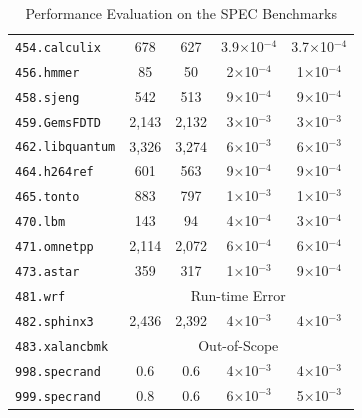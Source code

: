 \documentclass[letter]{ieice}
\begin{document}
\begin{table}[h]
{\begin{tabular}{l|cc|cc}
{{\tt 454.calculix}} & {678} & {627}  & {3.9$\times$10$^{-4}$} & {3.7$\times$10$^{-4}$}\\
{{\tt 456.hmmer}} & {85} & {50}  & {2$\times$10$^{-4}$} & {1$\times$10$^{-4}$}\\
{{\tt 458.sjeng}} & {542} & {513} &  {9$\times$10$^{-4}$} & {9$\times$10$^{-4}$}\\
{{\tt 459.GemsFDTD}} & {2,143} & {2,132}  & {3$\times$10$^{-3}$} & {3$\times$10$^{-3}$}\\
{{\tt 462.libquantum}} & {3,326} & {3,274}  & {6$\times$10$^{-3}$} & {6$\times$10$^{-3}$}\\
{{\tt 464.h264ref}} & {601} & {563}  & {9$\times$10$^{-4}$} & {9$\times$10$^{-4}$}\\
{{\tt 465.tonto}} & {883} & {797}  & {1$\times$10$^{-3}$} & {1$\times$10$^{-3}$}\\
{{\tt 470.lbm}} & {143} & {94} & {4$\times$10$^{-4}$} & {3$\times$10$^{-4}$}\\
{{\tt 471.omnetpp}} & {2,114} & {2,072} & {6$\times$10$^{-4}$} & {6$\times$10$^{-4}$}\\
{{\tt 473.astar}} & {359} & {317} &  {1$\times$10$^{-3}$} & {9$\times$10$^{-4}$}\\
{{\tt 481.wrf}} & \multicolumn{4}{c}{Run-time Error}\\
{{\tt 482.sphinx3}} & {2,436} & {2,392} &   {4$\times$10$^{-3}$} & {4$\times$10$^{-3}$}\\ %
{{\tt 483.xalancbmk}} & \multicolumn{4}{c}{Out-of-Scope}\\
{{\tt 998.specrand}} & {0.6} & {0.6} &  {4$\times$10$^{-3}$} & {4$\times$10$^{-3}$}\\
{{\tt 999.specrand}} & {0.8} & {0.6} &  {6$\times$10$^{-3}$} & {5$\times$10$^{-3}$}\\ \hline
\end{tabular}
}
\caption{Performance Evaluation on the SPEC Benchmarks\label{tab:spec_real}}
\vspace{-0.33in}
\end{table}

\end{document}
